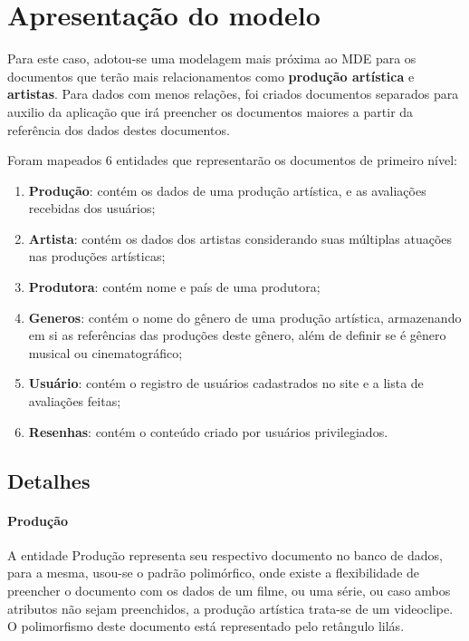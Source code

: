 \documentclass[
	12pt,				%
	openright,			%
	oneside,			%
	a4paper,			%
	english,			%
	french,				%
	spanish,			%
	brazil,				%
	]{abntex2}
\begin{document}
\chapter{Apresentação do modelo}

Para este caso, adotou-se uma modelagem mais próxima ao MDE para os documentos que terão mais relacionamentos como \textbf{produção artística} e \textbf{artistas}. Para dados com menos relações, foi criados documentos separados para auxilio da aplicação que irá preencher os documentos maiores a partir da referência dos dados destes documentos.

Foram mapeados 6 entidades que representarão os documentos de primeiro nível:

\begin{enumerate}
	\item \textbf{Produção}: contém os dados de uma produção artística, e as avaliações recebidas dos usuários;
	\item \textbf{Artista}: contém os dados dos artistas considerando suas múltiplas atuações nas produções artísticas;
	\item \textbf{Produtora}: contém nome e país de uma produtora;
	\item \textbf{Generos}: contém o nome do gênero de uma produção artística, armazenando em si as referências das produções deste gênero, além de definir se é gênero musical ou cinematográfico; 
	\item \textbf{Usuário}: contém o registro de usuários cadastrados no site e a lista de avaliações feitas;
	\item \textbf{Resenhas}: contém o conteúdo criado por usuários privilegiados.
\end{enumerate}

\section[]{Detalhes}
\subsubsection{Produção}
A entidade Produção representa seu respectivo documento no banco de dados, para a mesma, usou-se o padrão polimórfico, onde existe a flexibilidade de preencher o documento com os dados de um filme, ou uma série, ou caso ambos atributos não sejam preenchidos, a produção artística trata-se de um videoclipe. O polimorfismo deste documento está representado pelo retângulo lilás.
\end{document}
